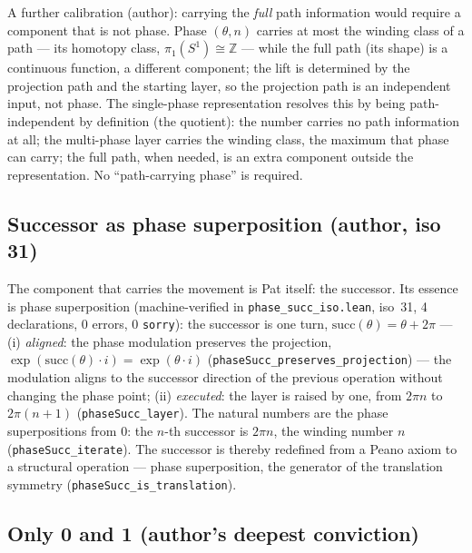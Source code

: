 \documentclass{article}
\begin{document}
A further calibration (author): carrying the \emph{full} path
information would require a component that is not phase. Phase
$(\theta,n)$ carries at most the winding class of a path --- its
homotopy class, $\pi_1(S^1)\cong\mathbb Z$ --- while the full path (its
shape) is a continuous function, a different component; the lift is
determined by the projection path and the starting layer, so the
projection path is an independent input, not phase. The single-phase
representation resolves this by being path-independent by definition
(the quotient): the number carries no path information at all; the
multi-phase layer carries the winding class, the maximum that phase can
carry; the full path, when needed, is an extra component outside the
representation. No ``path-carrying phase'' is required.

\subsection*{Successor as phase superposition (author, iso 31)}

The component that carries the movement is Pat itself: the successor.
Its essence is phase superposition (machine-verified in
\texttt{phase\_succ\_iso.lean}, iso~31, 4 declarations, 0 errors, 0
\texttt{sorry}): the successor is one turn,
$\mathrm{succ}(\theta)=\theta+2\pi$ --- (i) \emph{aligned}: the phase
modulation preserves the projection,
$\exp(\mathrm{succ}(\theta)\cdot i)=\exp(\theta\cdot i)$
(\texttt{phaseSucc\_preserves\_projection}) --- the modulation aligns to
the successor direction of the previous operation without changing the
phase point; (ii) \emph{executed}: the layer is raised by one, from
$2\pi n$ to $2\pi(n+1)$ (\texttt{phaseSucc\_layer}). The natural numbers
are the phase superpositions from $0$: the $n$-th successor is $2\pi n$,
the winding number $n$ (\texttt{phaseSucc\_iterate}). The successor is
thereby redefined from a Peano axiom to a structural operation --- phase
superposition, the generator of the translation symmetry
(\texttt{phaseSucc\_is\_translation}).

\subsection*{Only 0 and 1 (author's deepest conviction)}
\end{document}
